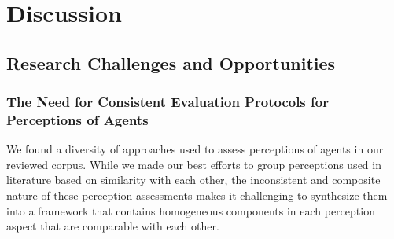 
\section{Discussion}

\subsection{Research Challenges and Opportunities}


\subsubsection{The Need for Consistent Evaluation Protocols for Perceptions of Agents}

We found a diversity of approaches used to assess perceptions of agents in our reviewed corpus. While we made our best efforts to group perceptions used in literature based on similarity with each other, the inconsistent and composite nature of these perception assessments makes it challenging to synthesize them into a framework that contains homogeneous components in each perception aspect that are comparable with each other.

